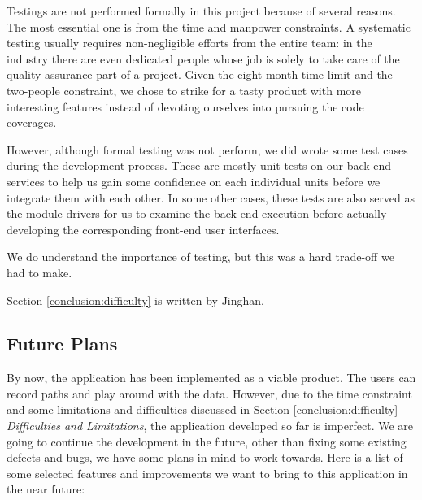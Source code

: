 \documentclass[12pt,a4paper]{article}
\begin{document}
            Testings are not performed formally in this project because of several reasons. The most essential one is from the time and manpower constraints. A systematic testing usually requires non-negligible efforts from the entire team: in the industry there are even dedicated people whose job is solely to take care of the quality assurance part of a project. Given the eight-month time limit and the two-people constraint, we chose to strike for a tasty product with more interesting features instead of devoting ourselves into pursuing the code coverages.
            
            However, although formal testing was not perform, we did wrote some test cases during the development process. These are mostly unit tests on our back-end services to help us gain some confidence on each individual units before we integrate them with each other. In some other cases, these tests are also served as the module drivers for us to examine the back-end execution before actually developing the corresponding front-end user interfaces.
            
            We do understand the importance of testing, but this was a hard trade-off we had to make.
            
            \footnotesize
                Section \ref{conclusion:difficulty} is written by Jinghan.
            \normalsize
        
        \subsection{Future Plans} %
            \label{conclusion:future-plan}
            By now, the application has been implemented as a viable product. The users can record paths and play around with the data. However, due to the time constraint and some limitations and difficulties discussed in Section \ref{conclusion:difficulty} \textit{Difficulties and Limitations}, the application developed so far is imperfect. We are going to continue the development in the future, other than fixing some existing defects and bugs, we have some plans in mind to work towards. Here is a list of some selected features and improvements we want to bring to this application in the near future:
            
\end{document}
